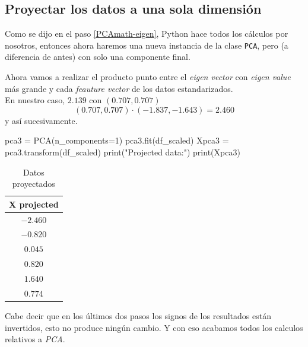 \subsection{Proyectar los datos a una sola dimensión}
Como se dijo en el paso \ref{PCAmath-eigen}, Python hace todos los cálculos por nosotros, entonces ahora haremos una nueva instancia de la clase \texttt{PCA}, pero (a diferencia de antes) con solo una componente final.\\[0.75em]
\begin{minipage}[c]{0.48\textwidth}
Ahora vamos a realizar el producto punto entre el \textit{eigen vector} con \textit{eigen value} más grande y cada \textit{feauture vector} de los datos estandarizados.\\

En nuestro caso, $2.139$ con $(0.707, 0.707)$
\[ (0.707, 0.707)\cdot(-1.837,-1.643)=2.460 \]
y así sucesivamente.
\end{minipage}
\hfill\vrule\hfill
\begin{minipage}[c]{0.48\textwidth}
\begin{jupyter}{9}
pca3 = PCA(n_components=1)
pca3.fit(df_scaled)
Xpca3 = pca3.transform(df_scaled)
print("Projected data:")
print(Xpca3)
\end{jupyter}
\end{minipage}
\begin{table}[H]
\centering
\begin{tabular}{c}
\sffamily X projected \\ \hline
\rowcolor[HTML]{EFEFEF} 
$-2.460$ \\
$-0.820$ \\
\rowcolor[HTML]{EFEFEF} 
$0.045$ \\
$0.820$ \\
\rowcolor[HTML]{EFEFEF} 
$1.640$ \\
$0.774$
\end{tabular}
\caption{Datos proyectados}\label{tab:PCAmath-projected}
\end{table}
Cabe decir que en los últimos dos pasos los signos de los resultados están invertidos, esto no produce ningún cambio. Y con eso acabamos todos los calculos relativos a \textit{PCA}.
